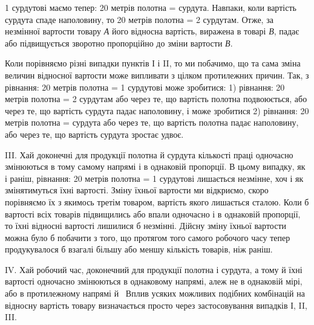 \parcont{}  %
1 сурдутові маємо тепер: 20 метрів полотна =  сурдута. Навпаки,
коли вартість сурдута спаде наполовину, то 20 метрів полотна
= 2 сурдутам. Отже, за незмінної вартости товару \emph{А} його
відносна вартість, виражена в товарі \emph{В}, падає або підвищується
зворотно пропорційно до зміни вартости \emph{В}.

Коли порівняємо різні випадки пунктів І і II, то ми побачимо,
що та сама зміна величин відносної вартости може випливати з
цілком протилежних причин. Так, з рівнання: 20 метрів полотна
= 1 сурдутові може зробитися: 1) рівнання: 20 метрів
полотна = 2 сурдутам або через те, що вартість полотна подвоюється,
або через те, що вартість сурдута падає наполовину, і
може зробитися 2) рівнання: 20 метрів полотна =  сурдута
або через те, що вартість полотна падає наполовину, або через те,
що вартість сурдута зростає удвоє.

III. Хай доконечні для продукції полотна й сурдута кількості
праці одночасно змінюються в тому самому напрямі і в однаковій
пропорції. В цьому випадку, як і раніш, рівнання: 20 метрів
полотна = 1 сурдутові лишається незмінне, хоч і як змінятимуться
їхні вартості. Зміну їхньої вартости ми відкриємо, скоро
порівняємо їх з якимось третім товаром, вартість якого лишається
сталою. Коли б вартості всіх товарів підвищились або впали
одночасно і в однаковій пропорції, то їхні відносні вартості лишилися
б незмінні. Дійсну зміну їхньої вартости можна було б
побачити з того, що протягом того самого робочого часу тепер
продукувалося б взагалі більшу або меншу кількість товарів,
ніж раніш.

IV. Хай робочий час, доконечний для продукції полотна і
сурдута, а тому й їхні вартості одночасно змінюються в однаковому
напрямі, алеж не в однаковій мірі, або в протилежному
напрямі й~ Вплив усяких можливих подібних комбінацій
на відносну вартість товару визначається просто через застосовування
випадків І, II, III.

